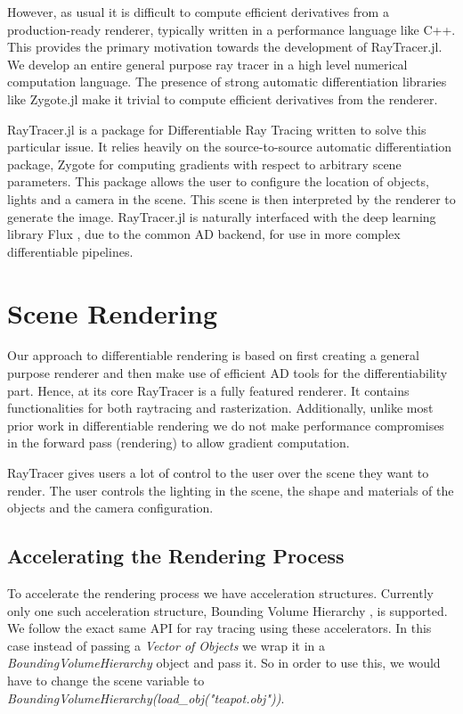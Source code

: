 \documentclass{juliacon}
\begin{document}
However, as usual it is difficult to compute efficient derivatives from a production-ready renderer, typically written in a performance language like C++. This provides the primary motivation towards the development of RayTracer.jl. We develop an entire general purpose ray tracer in a high level numerical computation language. The presence of strong automatic differentiation libraries like Zygote.jl make it trivial to compute efficient derivatives from the renderer.

RayTracer.jl \cite{RayTracer.jl} is a package for Differentiable Ray Tracing written to solve this particular issue. It relies heavily on the source-to-source automatic differentiation package, Zygote for computing gradients with respect to arbitrary scene parameters. This package allows the user to configure the location of objects, lights and a camera in the scene. This scene is then interpreted by the renderer to generate the image. RayTracer.jl is naturally interfaced with the deep learning library Flux \cite{Flux.jl-2018}, due to the common AD backend, for use in more complex differentiable pipelines.


\section{Scene Rendering}

Our approach to differentiable rendering is based on first creating a general purpose renderer and then make use of efficient AD tools for the differentiability part. Hence, at its core RayTracer is a fully featured renderer. It contains functionalities for both raytracing and rasterization. Additionally, unlike most prior work in differentiable rendering we do not make performance compromises in the forward pass (rendering) to allow gradient computation.

RayTracer gives users a lot of control to the user over the scene they want to render. The user controls the lighting in the scene, the shape and materials of the objects and the camera configuration.

\subsection{Accelerating the Rendering Process}

To accelerate the rendering process we have acceleration structures. Currently only one such acceleration structure, Bounding Volume Hierarchy \cite{Kay:1986:RTC:15922.15916}, is supported. We follow the exact same API for ray tracing using these accelerators. In this case instead of passing a \textit{Vector of Objects} we wrap it in a \textit{BoundingVolumeHierarchy} object and pass it. So in order to use this, we would have to change the scene variable to \textit{BoundingVolumeHierarchy(load\_obj("teapot.obj"))}.
\end{document}

